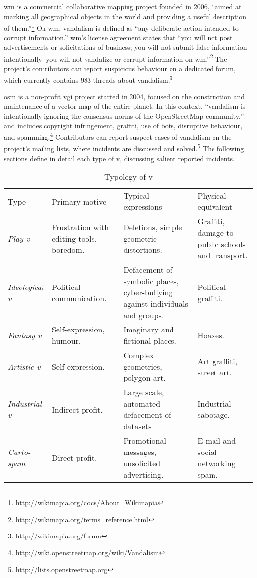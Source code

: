 \documentclass{article} \usepackage{graphicx,xspace}
\newcommand{\footurl}[1]{\footnote{\url{#1}}}
\begin{document}
\gls{wm} is a commercial collaborative mapping project founded in 2006, ``aimed at marking all geographical objects in the world and providing a useful description of them.''\footurl{http://wikimapia.org/docs/About_Wikimapia}
On \gls{wm}, vandalism is defined as ``any deliberate action intended to corrupt information.'' \gls{wm}'s license agreement states that ``you will not post advertisements or solicitations of business;
you will not submit false information intentionally;
you will not vandalize or corrupt information on \gls{wm}.''\footurl{http://wikimapia.org/terms_reference.html}
The project's contributors can report suspicious behaviour on a dedicated forum, which currently contains 983 threads about vandalism.\footurl{http://wikimapia.org/forum}


\gls{osm} is a non-profit \gls{vgi} project started in 2004, focused on the construction and maintenance of a vector map of the entire planet.
In this context, ``vandalism is intentionally ignoring the consensus norms of the OpenStreetMap community,'' and includes copyright infringement, graffiti, use of bots, disruptive behaviour, and spamming.\footurl{http://wiki.openstreetmap.org/wiki/Vandalism}
Contributors can report suspect cases of vandalism on the project's mailing lists, where incidents are discussed and solved.\footurl{http://lists.openstreetmap.org}
The following sections define in detail each type of \gls{v}, discussing salient reported incidents.

\renewcommand{\arraystretch}{1.3}
\begin{table}[t]
\begin{tabular}{P{8em}P{7em}P{9em}P{8.5em}}
Type & Primary motive & Typical expressions &  Physical equivalent \\
\emph{Play \gls{v}} 		& Frustration with editing tools, boredom. & Deletions, simple geometric distortions. & Graffiti, damage to public schools and transport. \\ \emph{Ideological \gls{v}} & Political communication. & Defacement of symbolic places, cyber-bullying against individuals and groups. & Political graffiti. \\ \emph{Fantasy \gls{v}} 	& Self-expression, humour. & Imaginary and fictional places. & Hoaxes. \\ \emph{Artistic \gls{v}} 	& Self-expression. & Complex geometries, polygon art. & Art graffiti, street art. \\ \emph{Industrial \gls{v}} 	& Indirect profit. & Large scale, automated defacement of datasets & Industrial sabotage. \\ \emph{Carto-spam} 			& Direct profit. & Promotional messages, unsolicited advertising. & E-mail and social networking spam. \\ 
\end{tabular}
  \caption{Typology of \gls{v}}
  \label{table:geovandalism}
\end{table}
\end{document}
